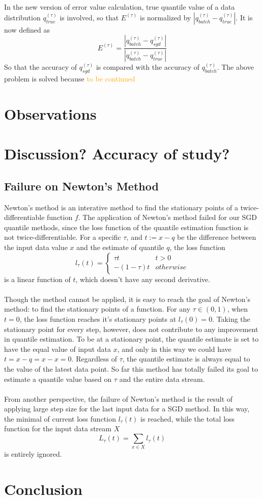 \documentclass[12pt]{article}
\begin{document}
\\\\
In the new version of error value calculation, true quantile value of a data distribution $q_{true}^{(\tau)}$ is involved, so that $E^{(\tau)}$ is normalized by $|q_{batch}^{(\tau)} - q_{true}^{(\tau)}|$. It is now defined as
$$
    E^{(\tau)} = \frac{|q_{batch}^{(\tau)} - q_{sgd}^{(\tau)}|}
                      {|q_{batch}^{(\tau)} - q_{true}^{(\tau)}|}
$$
So that the accuracy of $q_{sgd}^{(\tau)}$ is compared with the accuracy of $q_{batch}^{(\tau)}$. The above problem is solved because \textcolor{orange}{to be continued}

\section{Observations}


\section{Discussion? Accuracy of study?}
\subsection{Failure on Newton's Method}
Newton's method is an interative method to find the stationary points of a twice-differentiable function $f$. The application of Newton's method failed for our SGD quantile methods, since the loss function of the quantile estimation function is not twice-differentiable. For a specific $\tau$, and $t := x - q$ be the difference between the input data value $x$ and the estimate of quantile $q$, the loss function 
$$
l_\tau(t)= 
    \begin{cases}
        \tau t & t > 0\\
        -(1-\tau) t & otherwise
    \end{cases}
$$
is a linear function of $t$, which doesn't have any second derivative. 
\\\\
Though the method cannot be applied, it is easy to reach the goal of Newton's method: to find the stationary points of a function. For any $\tau \in (0,1)$, when $t=0$, the loss function reaches it's stationary points at $l_\tau(0) = 0$. Taking the stationary point for every step, however, does not contribute to any improvement in quantile estimation. To be at a stationary point, the quantile estimate is set to have the equal value of input data $x$, and only in this way we could have $t = x-q = x-x = 0$. Regardless of $\tau$, the quantile estimate is always equal to the value of the latest data point. So far this method has totally failed its goal to estimate a quantile value based on $\tau$ and the entire data stream.
\\\\
From another perspective, the failure of Newton's method is the result of applying large step size for the last input data for a SGD method. In this way, the minimal of current loss function $l_\tau(t)$ is reached, while the total loss function for the input data stream $X$
$$
L_{\tau}(t) = \sum_{x \in X} l_{\tau}(t)
$$
is entirely ignored.
\section{Conclusion}
\end{document}
